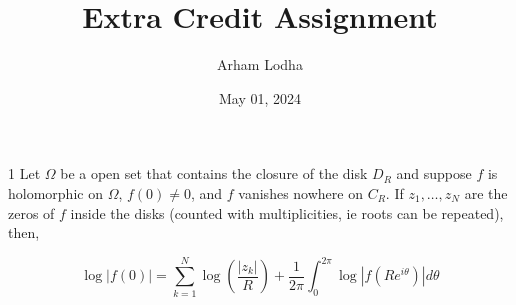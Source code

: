 \documentclass{article}
\newcommand{\abs}[1]{\left\lvert #1\right\rvert}
\begin{document}
\title{Extra Credit Assignment}
\author{Arham Lodha}%
\date{May 01, 2024}%
\maketitle

\begin{claim}{1}\label{Claim 1.}
    Let $\Omega$ be a open set that contains the closure of the disk $D_R$ and suppose $f$ is holomorphic on $\Omega$, $f(0) \neq 0$, and $f$ vanishes nowhere on $C_R$. If $z_1, \dots, z_N$ are the zeros of $f$ inside the disks (counted with multiplicities, ie roots can be repeated), then, 
    
    \begin{equation}
        \log\abs{f(0)} = \sum_{k = 1}^{N} \log\left(\frac{\abs{z_k}}{R}\right) + \frac{1}{2 \pi} \int_{0}^{2\pi} \log\abs{f(Re^{i \theta})} d \theta
    \end{equation}
\end{claim}
\end{document}
